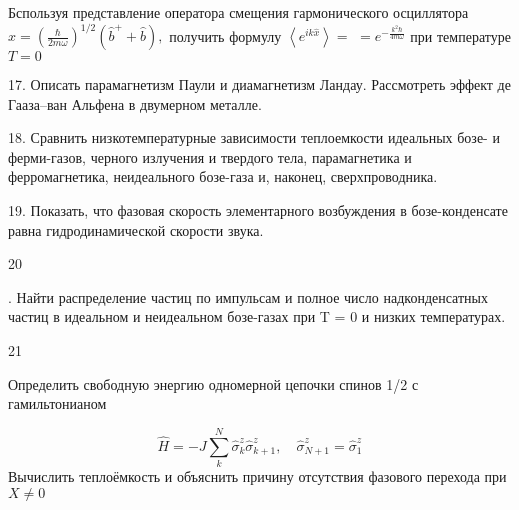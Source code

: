 \documentclass[a4paper,12pt]{article} %
\begin{document}
\begin{task}

Бспользуя представление оператора смещения гармонического осциллятора $\hat{x}=\left(\frac{\hbar}{2 m \omega}\right)^{1 / 2}\left(\hat{b}^{+}+\hat{b}\right),$ получить формулу $\left\langle e^{i k \hat{x}}\right\rangle=$
$=e^{-\frac{k^{2} \hbar}{4 m \omega}}$ при температуре $T=0$

\end{task}




\begin{task}
17. Описать парамагнетизм Паули и диамагнетизм Ландау. Рассмотреть эффект де Гааза–ван Альфена в двумерном металле. 

\end{task}


\begin{task}

18. Сравнить низкотемпературные зависимости теплоемкости идеальных бозе- и ферми-газов, черного излучения и твердого тела, парамагнетика и ферромагнетика, неидеального бозе-газа и, наконец, сверхпроводника. 


\end{task}






\begin{task}

19. Показать, что фазовая скорость элементарного возбуждения в бозе-конденсате равна гидродинамической скорости звука.


\end{task}



\begin{task}

20

. Найти распределение частиц по импульсам и полное число надконденсатных частиц в идеальном и неидеальном бозе-газах при T = 0 и низких температурах.


\end{task}



\begin{task}

21

Определить свободную энергию одномерной цепочки спинов 1/2 с гамильтонианом

$$\hat{H}=-J \sum_{k}^{N} \hat{\sigma}_{k}^{z} \hat{\sigma}_{k+1}^{z}, \quad \hat{\sigma}_{N+1}^{z}=\hat{\sigma}_{1}^{z}$$
Вычислить теплоёмкость и объяснить причину отсутствия фазового перехода при $ X\ne 0 $
\end{task}
\end{document}
